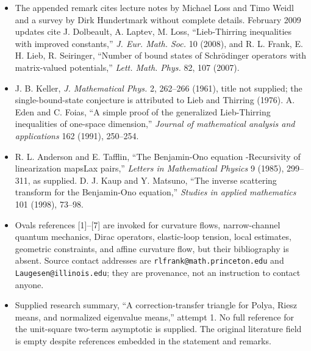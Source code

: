 \documentclass[11pt]{article}
\begin{document}
\begin{itemize}
\item The appended remark cites lecture notes by Michael Loss and Timo Weidl and a survey by Dirk Hundertmark without complete details. February 2009 updates cite J. Dolbeault, A. Laptev, M. Loss, ``Lieb-Thirring inequalities with improved constants,'' \emph{J. Eur. Math. Soc.} 10 (2008), and R. L. Frank, E. H. Lieb, R. Seiringer, ``Number of bound states of Schr\"odinger operators with matrix-valued potentials,'' \emph{Lett. Math. Phys.} 82, 107 (2007).
\item J. B. Keller, \emph{J. Mathematical Phys.} 2, 262--266 (1961), title not supplied; the single-bound-state conjecture is attributed to Lieb and Thirring (1976). A. Eden and C. Foias, ``A simple proof of the generalized Lieb-Thirring inequalities of one-space dimension,'' \emph{Journal of mathematical analysis and applications} 162 (1991), 250--254.
\item R. L. Anderson and E. Tafflin, ``The Benjamin-Ono equation -Recursivity of linearization mapsLax pairs,'' \emph{Letters in Mathematical Physics} 9 (1985), 299--311, as supplied. D. J. Kaup and Y. Matsuno, ``The inverse scattering transform for the Benjamin-Ono equation,'' \emph{Studies in applied mathematics} 101 (1998), 73--98.
\item Ovals references [1]--[7] are invoked for curvature flows, narrow-channel quantum mechanics, Dirac operators, elastic-loop tension, local estimates, geometric constraints, and affine curvature flow, but their bibliography is absent. Source contact addresses are \texttt{rlfrank@math.princeton.edu} and \texttt{Laugesen@illinois.edu}; they are provenance, not an instruction to contact anyone.
\item Supplied research summary, ``A correction-transfer triangle for Polya, Riesz means, and normalized eigenvalue means,'' attempt 1. No full reference for the unit-square two-term asymptotic is supplied. The original literature field is empty despite references embedded in the statement and remarks.
\end{itemize}
\end{document}
